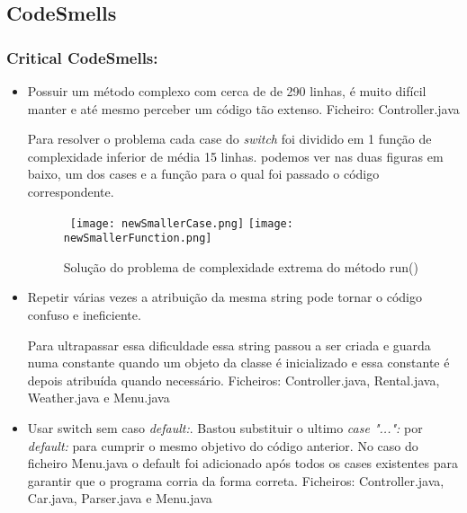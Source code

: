 \subsection{CodeSmells}

\subsubsection{Critical CodeSmells:}
\begin{itemize}
\item Possuir um método complexo com cerca de de 290 linhas, é muito difícil manter e até mesmo perceber um código tão extenso.\newline
 Ficheiro: Controller.java\newline

\par Para resolver o problema cada case do \textit{switch} foi dividido em 1 função de complexidade inferior de média 15 linhas. podemos ver nas duas figuras em baixo, um dos cases e a função para o qual foi passado o código correspondente.

\begin{figure}[H]

  \hbox{\hspace{+1em}  \texttt{[image: newSmallerCase.png]}}
  \centering
  \texttt{[image: newSmallerFunction.png]}
  \caption {Solução do problema de complexidade extrema do método run()}

  \label {fig10}

\end{figure}
\end{itemize}

\begin{itemize}
\item Repetir várias vezes a atribuição da mesma string pode tornar o código confuso e ineficiente. \newline
\par Para ultrapassar essa dificuldade essa string passou a ser criada e guarda numa constante quando um objeto da classe é inicializado e essa constante é depois atribuída quando necessário. \newline
 Ficheiros: Controller.java, Rental.java, Weather.java e Menu.java\newline
\end{itemize}

\begin{itemize}
\item Usar switch sem caso \textit{default:}. Bastou substituir o ultimo \textit{case "...":} por \textit{default:} para cumprir o mesmo objetivo do código anterior. No caso do ficheiro Menu.java o default foi adicionado após todos os cases existentes para garantir que o programa corria da forma correta.\newline
 Ficheiros: Controller.java, Car.java, Parser.java e Menu.java\newline
\end{itemize}

